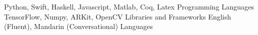 \begin{cventries}
  \cvsmallentry
    {Python, Swift, Haskell, Javascript, Matlab, Coq, Latex}
    {Programming Languages}
    {}
    {}
    {}
  \cvsmallentry
    {TensorFlow, Numpy, ARKit, OpenCV}
    {Libraries and Frameworks}
    {}
    {}
    {}
  \cvsmallentry
    {English (Fluent), Mandarin (Conversational)}
    {Languages}
    {}
    {}
    {}
\end{cventries}


